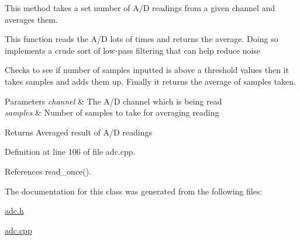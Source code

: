 This method takes a set number of A/\-D readings from a given channel and averages them. 

This function reads the A/\-D lots of times and returns the average. Doing so implements a crude sort of low-\/pass filtering that can help reduce noise

Checks to see if number of samples inputted is above a threshold values then it takes samples and adds them up. Finally it returns the average of samples taken. 
\begin{DoxyParams}{Parameters}
{\em channel} & The A/\-D channel which is being read \\
\hline
{\em samples} & Number of samples to take for averaging reading \\
\hline
\end{DoxyParams}
\begin{DoxyReturn}{Returns}
Averaged result of A/\-D readings 
\end{DoxyReturn}


Definition at line 106 of file adc.\-cpp.



References read\-\_\-once().



The documentation for this class was generated from the following files\-:\begin{DoxyCompactItemize}
\item 
\hyperlink{adc_8h}{adc.\-h}\item 
\hyperlink{adc_8cpp}{adc.\-cpp}\end{DoxyCompactItemize}
